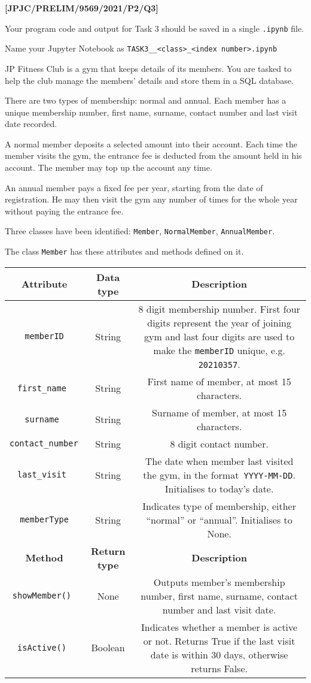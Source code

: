 \item \textbf{{[}JPJC/PRELIM/9569/2021/P2/Q3{]} }

Your program code and output for Task 3 should be saved in a single
\texttt{.ipynb} file. 

Name your Jupyter Notebook as \texttt{TASK3\_<your name>\_<class>\_<index
number>.ipynb }

JP Fitness Club is a gym that keeps details of its members. You are
tasked to help the club manage the members\textquoteright{} details
and store them in a SQL database. 

There are two types of membership: normal and annual. Each member
has a unique membership number, first name, surname, contact number
and last visit date recorded. 

A normal member deposits a selected amount into their account. Each
time the member visits the gym, the entrance fee is deducted from
the amount held in his account. The member may top up the account
any time. 

An annual member pays a fixed fee per year, starting from the date
of registration. He may then visit the gym any number of times for
the whole year without paying the entrance fee. 

Three classes have been identified: \texttt{Member}, \texttt{NormalMember},
\texttt{AnnualMember}. 

The class \texttt{Member} has these attributes and methods defined
on it. 

\begin{tabular}{|c|c|c|}
\hline 
\textbf{Attribute} & \textbf{Data type} & \textbf{Description}\tabularnewline
\hline 
\texttt{memberID} & String  & 8 digit membership number. First four digits represent the year of
joining gym and last four digits are used to make the \texttt{memberID}
unique, e.g. \texttt{20210357}. \tabularnewline
\hline 
\texttt{first\_name } & String  & First name of member, at most 15 characters.\tabularnewline
\hline 
\texttt{surname } & String  & Surname of member, at most 15 characters.\tabularnewline
\hline 
\texttt{contact\_number } & String  & 8 digit contact number.\tabularnewline
\hline 
\texttt{last\_visit } & String  & The date when member last visited the gym, in the format\texttt{ YYYY-MM-DD}.
Initialises to today\textquoteright s date. \tabularnewline
\hline 
\texttt{memberType} & String  & Indicates type of membership, either \textquotedblleft normal\textquotedblright{}
or \textquotedblleft annual\textquotedblright . Initialises to None. \tabularnewline
\hline 
\textbf{Method} & \textbf{Return type} & \textbf{Description}\tabularnewline
\hline 
\texttt{showMember() } & None  & Outputs member\textquoteright s membership number, first name, surname,
contact number and last visit date.\tabularnewline
\hline 
\texttt{isActive() } & Boolean  & Indicates whether a member is active or not. Returns True if the last
visit date is within 30 days, otherwise returns False.\tabularnewline
\hline 
\end{tabular}

